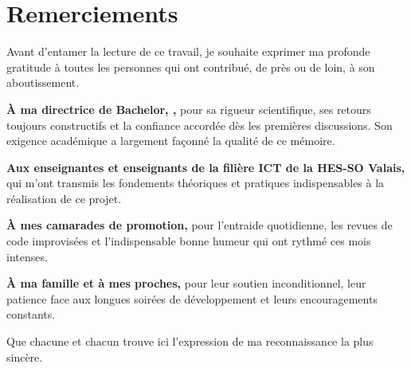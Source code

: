 \chapter*{Remerciements}
\setlength{\parindent}{0pt}

\noindent
Avant d’entamer la lecture de ce travail, je souhaite exprimer ma profonde gratitude à toutes les personnes qui ont contribué, de près ou de loin, à son aboutissement.

\vspace{0.8em}
\textbf{À ma directrice de Bachelor, \Advisor{},} pour sa rigueur scientifique, ses retours toujours constructifs et la confiance accordée dès les premières discussions. Son exigence académique a largement façonné la qualité de ce mémoire.

\vspace{0.8em}
\textbf{Aux enseignantes et enseignants de la filière ICT de la HES-SO Valais,} qui m’ont transmis les fondements théoriques et pratiques indispensables à la réalisation de ce projet.

\vspace{0.8em}
\textbf{À mes camarades de promotion,} pour l’entraide quotidienne, les revues de code improvisées et l’indispensable bonne humeur qui ont rythmé ces mois intenses.

\vspace{0.8em}
\textbf{À ma famille et à mes proches,} pour leur soutien inconditionnel, leur patience face aux longues soirées de développement et leurs encouragements constants.

\vspace{1em}
\noindent
Que chacune et chacun trouve ici l’expression de ma reconnaissance la plus sincère.
